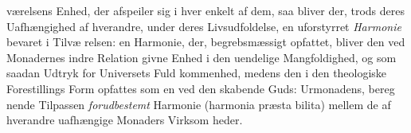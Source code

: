 \documentclass[12pt,a4paper]{book}
\begin{document}
værelsens Enhed, der afspeiler sig i hver enkelt af dem, saa
bliver der, trods deres Uafhængighed af hverandre, under deres
Livsudfoldelse, en uforstyrret \emph{Harmonie} bevaret i Tilvæ\-%
relsen: en Harmonie, der, begrebsmæssigt opfattet, bliver den
ved Monadernes indre Relation givne Enhed i den uendelige
\setcounter{footnote}{0}%
Mangfoldighed, og som saadan Udtryk for Universets Fuld\-%
kommenhed, medens den i den theologiske Forestillings Form
opfattes som en ved den skabende Guds: Urmonadens, bereg\-%
nende Tilpassen \emph{forudbestemt} Harmonie (harmonia præsta\-%
bilita) mellem de af hverandre uafhængige Monaders Virksom\-%
heder.
\end{document}

